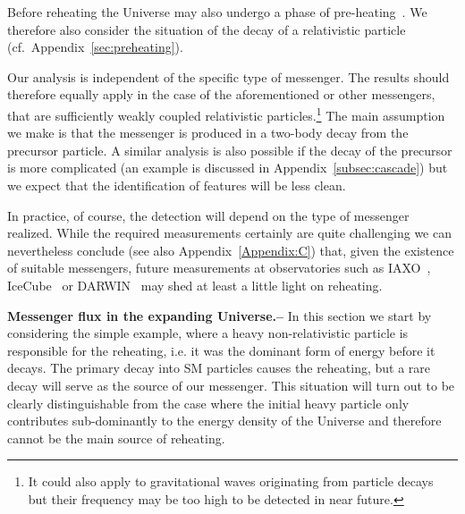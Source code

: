 \documentclass[superscriptaddress,aps,preprintnumbers,amsmath,showpacs,amssymb,prd,nofootinbib,reprint]{revtex4-1}
\begin{document}
Before reheating the Universe may also undergo a phase of pre-heating~\cite{Traschen:1990sw,Kofman:1994rk, Shtanov:1994ce, Yoshimura:1995gc, Kasuya:1996np, Kofman:1997yn, Berges:2002cz, Mukhanov:2005sc, Dufaux:2006ee, Matsumoto:2007rd,
  Asaka:2010kv, Mukaida:2013xxa, Amin:2019qrx, Kitajima:2017peg,
  Agrawal:2018vin, Co:2018lka, Dror:2018pdh, Lozanov:2019jxc,
  Alonso-Alvarez:2019ssa, Moroi:2020bkq}. We therefore also consider the situation of the decay of a relativistic particle (cf.~Appendix~\ref{sec:preheating}).

Our analysis is independent of the specific type of messenger. The results should therefore equally apply in the case of the aforementioned or other messengers, that are 
sufficiently weakly coupled relativistic particles.\footnote{It could also apply to gravitational waves originating from particle decays~\cite{Nakayama:2018ptw} but their frequency may be too high to be detected in near future.} 
The main assumption we make is that the messenger is produced in a two-body decay from the precursor particle.
A similar analysis is also possible if the decay of the precursor is more complicated (an example is discussed in Appendix~\ref{subsec:cascade}) but we expect that the identification of features will be less clean.

In practice, of course, the detection will depend on the type of messenger realized.
While the required measurements certainly are quite challenging we can nevertheless conclude (see also Appendix~\ref{Appendix:C}) that, given the existence of suitable messengers, future measurements at observatories such as IAXO~\cite{Irastorza:2011gs,Armengaud:2014gea,Armengaud:2019uso,Abeln:2020ywv}, IceCube~\cite{2009arXiv0907.2263W,Aartsen:2014gkd,Aartsen:2014njl,Aartsen:2020aqd,Abbasi:2020jmh} or DARWIN~\cite{Aalbers:2016jon} may shed at least a little light on reheating. 


\vspace{0.2cm}

{\bf Messenger flux in the expanding Universe.--} \label{sec:setup}
In this section we start by considering the simple example, where a heavy non-relativistic particle is responsible for the reheating, i.e. it was the dominant form of energy before it decays. The {primary} decay into SM particles causes the reheating, but a {rare decay will serve as the source of} our messenger. 
This situation will turn out to be clearly distinguishable from the case where the initial heavy particle only contributes sub-dominantly to the energy density of the Universe and therefore cannot be the main source of reheating.
\end{document}
